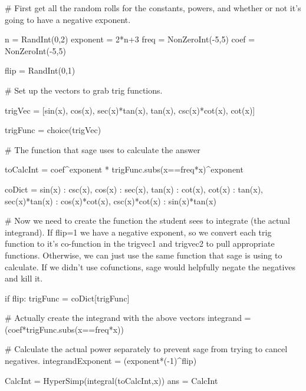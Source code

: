 



\begin{sagesilent}
# First get all the random rolls for the constants, powers, and whether or not it's going to have a negative exponent.

n = RandInt(0,2)
exponent = 2*n+3
freq = NonZeroInt(-5,5)
coef = NonZeroInt(-5,5)

flip = RandInt(0,1)

# Set up the vectors to grab trig functions.

trigVec = [sin(x), cos(x), sec(x)*tan(x), tan(x), csc(x)*cot(x), cot(x)]

trigFunc = choice(trigVec)

# The function that sage uses to calculate the answer

toCalcInt = coef^exponent * trigFunc.subs(x==freq*x)^exponent

coDict = {
  sin(x) : csc(x),
  cos(x) : sec(x),
  tan(x) : cot(x),
  cot(x) : tan(x),
  sec(x)*tan(x) : cos(x)*cot(x),
  csc(x)*cot(x) : sin(x)*tan(x)
}

# Now we need to create the function the student sees to integrate (the actual integrand). If flip=1 we have a negative exponent, so we convert each trig function to it's co-function in the trigvec1 and trigvec2 to pull appropriate functions. Otherwise, we can just use the same function that sage is using to calculate. If we didn't use cofunctions, sage would helpfully negate the negatives and kill it.

if flip:
  trigFunc = coDict[trigFunc]

# Actually create the integrand with the above vectors
integrand = (coef*trigFunc.subs(x==freq*x))

# Calculate the actual power separately to prevent sage from trying to cancel negatives.
integrandExponent = (exponent*(-1)^flip)

CalcInt = HyperSimp(integral(toCalcInt,x))
ans = CalcInt

\end{sagesilent}

